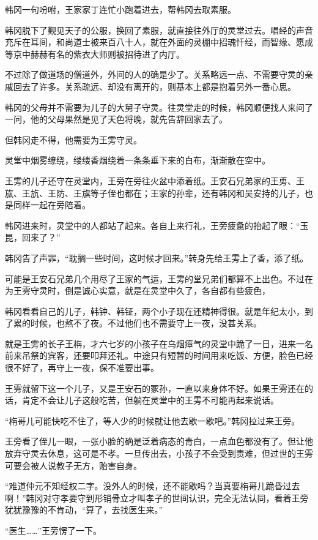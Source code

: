 韩冈一句吩咐，王家家丁连忙小跑着进去，帮韩冈去取素服。

韩冈脱下了觐见天子的公服，换回了素服，就直接往外厅的灵堂过去。唱经的声音充斥在耳间，和尚道士被来百八十人，就在外面的灵棚中招魂忏经，而智缘、愿成等京中赫赫有名的紫衣大师则被招待进了内厅。

不过除了做道场的僧道外，外间的人的确是少了。关系略远一点、不需要守灵的亲戚回去了许多。关系疏远、却没有离开的，则基本上都是抱着另外一番心思。

韩冈的父母并不需要为儿子的大舅子守灵。往灵堂走的时候，韩冈顺便找人来问了一问，他的父母果然是见了天色将晚，就先告辞回家去了。

但韩冈走不得，他需要为王雱守灵。

灵堂中烟雾缭绕，缕缕香烟绕着一条条垂下来的白布，渐渐散在空中。

王雱的儿子还守在灵堂内，王旁在旁往火盆中添着纸。王安石兄弟家的王旉、王旊、王斻、王防、王旗等子侄也都在；王家的孙辈，还有韩冈和吴安持的儿子，也是同样一起在旁陪着。

韩冈进来时，灵堂中的人都站了起来。各自上来行礼，王旁疲惫的抬起了眼：“玉昆，回来了？”

韩冈告了声罪，“耽搁一些时间，这时候才回来。”转身先给王雱上了香，添了纸。

可能是王安石兄弟几个用尽了王家的气运，王雱的堂兄弟们都算不上出色。不过在为王雱守灵时，倒是诚心实意，就是在灵堂中久了，各自都有些疲色，

韩冈看看自己的儿子，韩钟、韩钲，两个小子现在还精神得很。就是年纪太小，到了累的时候，也熬不了夜。不过他们也不需要守上一夜，没甚关系。

就是王雱的长子王栴，才六七岁的小孩子在乌烟瘴气的灵堂中跪了一日，进来一名前来吊祭的宾客，还要叩拜还礼。中途只有短暂的时间用来吃饭、方便，脸色已经很不好了，再守上一夜，保不准要出事。

王雱就留下这一个儿子，又是王安石的冢孙，一直以来身体不好。如果王雱还在的话，肯定不会让儿子这般吃苦，但躺在灵堂中的王雱不可能再起来说话。

“栴哥儿可能快吃不住了，等人少的时候就让他去歇一歇吧。”韩冈拉过来王旁。

王旁看了侄儿一眼，一张小脸的确是泛着病态的青白，一点血色都没有了。但让他放弃守灵去休息，这可是不孝。一旦传出去，小孩子不会受到责难，但过世的王雱可要会被人说教子无方，贻害自身。

“难道仲元不知经权二字。没外人的时候，还不能歇吗？当真要栴哥儿跪昏过去啊！”韩冈对守孝要守到形销骨立才叫孝子的世间认识，完全无法认同，看着王旁犹犹豫豫的不肯动，“算了，去找医生来。”

“医生……”王旁愣了一下。

